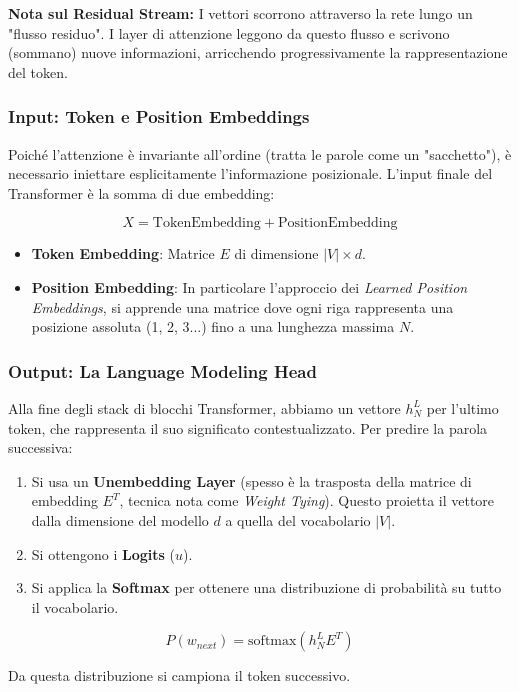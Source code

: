             \textbf{Nota sul Residual Stream:} I vettori scorrono attraverso la rete lungo un "flusso residuo". I layer di attenzione leggono da questo flusso e scrivono (sommano) nuove informazioni, arricchendo progressivamente la rappresentazione del token.
        
        \subsubsection{Input: Token e Position Embeddings}
            
            Poiché l'attenzione è invariante all'ordine (tratta le parole come un "sacchetto"), è necessario iniettare esplicitamente l'informazione posizionale.
            L'input finale del Transformer è la somma di due embedding:
            
            \[ X = \text{TokenEmbedding} + \text{PositionEmbedding} \]
            
            \begin{itemize}
                \item \textbf{Token Embedding}: Matrice $E$ di dimensione $|V| \times d$.
                \item \textbf{Position Embedding}: In particolare l'approccio dei \textit{Learned Position Embeddings}, si apprende una matrice dove ogni riga rappresenta una posizione assoluta (1, 2, 3...) fino a una lunghezza massima $N$.
            \end{itemize}
            
        \subsubsection{Output: La Language Modeling Head}
        
            Alla fine degli stack di blocchi Transformer, abbiamo un vettore $h_N^L$ per l'ultimo token, che rappresenta il suo significato contestualizzato. Per predire la parola successiva:
            
            \begin{enumerate}
                \item Si usa un \textbf{Unembedding Layer} (spesso è la trasposta della matrice di embedding $E^T$, tecnica nota come \textit{Weight Tying}). Questo proietta il vettore dalla dimensione del modello $d$ a quella del vocabolario $|V|$.
                \item Si ottengono i \textbf{Logits} ($u$).
                \item Si applica la \textbf{Softmax} per ottenere una distribuzione di probabilità su tutto il vocabolario.
            \end{enumerate}
            $$P(w_{next}) = \text{softmax}(h_N^L E^T)$$
            
            Da questa distribuzione si campiona il token successivo.